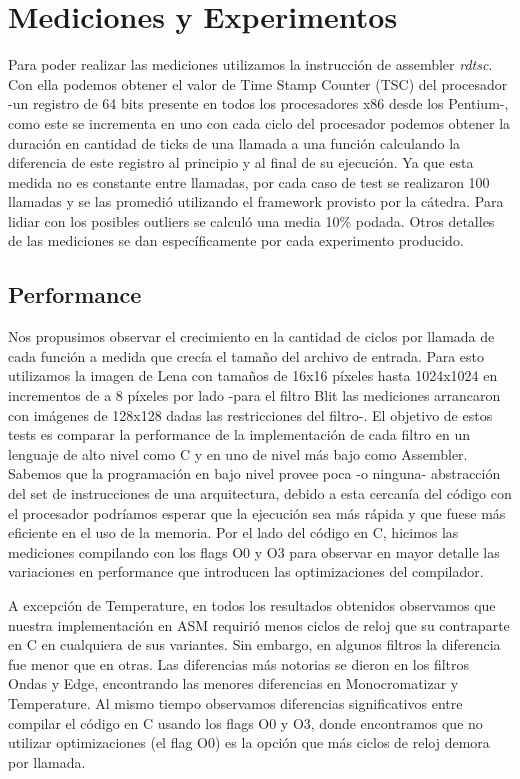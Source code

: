\section{Mediciones y Experimentos}

Para poder realizar las mediciones utilizamos la instrucción de assembler \textit{rdtsc}. Con ella podemos obtener el valor de Time Stamp Counter (TSC) del procesador -un registro de 64 bits presente en todos los procesadores x86 desde los Pentium-, como este se incrementa en uno con cada ciclo del procesador podemos obtener la duración en cantidad de ticks de una llamada a una función calculando la diferencia de este registro al principio y al final de su ejecución. Ya que esta medida no es constante entre llamadas, por cada caso de test se realizaron 100 llamadas y se las promedió utilizando el framework provisto por la cátedra. Para lidiar con los posibles outliers se calculó una media 10\% podada. Otros detalles de las mediciones se dan específicamente por cada experimento producido.

\subsection{Performance}

Nos propusimos observar el crecimiento en la cantidad de ciclos por llamada de cada función a medida que crecía el tamaño del archivo de entrada. Para esto utilizamos la imagen de Lena con tamaños de 16x16 píxeles hasta 1024x1024 en incrementos de a 8 píxeles por lado -para el filtro Blit las mediciones arrancaron con imágenes de 128x128 dadas las restricciones del filtro-. El objetivo de estos tests es comparar la performance de la implementación de cada filtro en un lenguaje de alto nivel como C y en uno de nivel más bajo como Assembler. Sabemos que la programación en bajo nivel provee poca -o ninguna- abstracción del set de instrucciones de una arquitectura, debido a esta cercanía del código con el procesador podríamos esperar que la ejecución sea más rápida y que fuese más eficiente en el uso de la memoria. Por el lado del código en C, hicimos las mediciones compilando con los flags O0 y O3 para observar en mayor detalle las variaciones en performance que introducen las optimizaciones del compilador.

A excepción de Temperature, en todos los resultados obtenidos observamos que nuestra implementación en ASM requirió menos ciclos de reloj que su contraparte en C en cualquiera de sus variantes. Sin embargo, en algunos filtros la diferencia fue menor que en otras. Las diferencias más notorias se dieron en los filtros Ondas y Edge, encontrando las menores diferencias en Monocromatizar y Temperature. Al mismo tiempo observamos diferencias significativos entre compilar el código en C usando los flags O0 y O3, donde encontramos que no utilizar optimizaciones (el flag O0) es la opción que más ciclos de reloj demora por llamada. 

